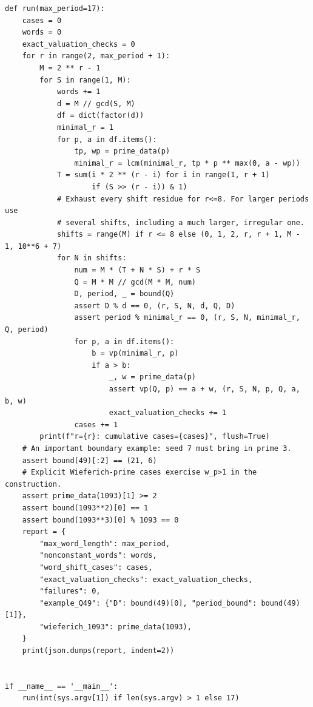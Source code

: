 \documentclass[11pt]{article}
\theoremstyle{definition}
\theoremstyle{remark}
\begin{document}
\begin{lstlisting}
def run(max_period=17):
    cases = 0
    words = 0
    exact_valuation_checks = 0
    for r in range(2, max_period + 1):
        M = 2 ** r - 1
        for S in range(1, M):
            words += 1
            d = M // gcd(S, M)
            df = dict(factor(d))
            minimal_r = 1
            for p, a in df.items():
                tp, wp = prime_data(p)
                minimal_r = lcm(minimal_r, tp * p ** max(0, a - wp))
            T = sum(i * 2 ** (r - i) for i in range(1, r + 1)
                    if (S >> (r - i)) & 1)
            # Exhaust every shift residue for r<=8. For larger periods use
            # several shifts, including a much larger, irregular one.
            shifts = range(M) if r <= 8 else (0, 1, 2, r, r + 1, M - 1, 10**6 + 7)
            for N in shifts:
                num = M * (T + N * S) + r * S
                Q = M * M // gcd(M * M, num)
                D, period, _ = bound(Q)
                assert D % d == 0, (r, S, N, d, Q, D)
                assert period % minimal_r == 0, (r, S, N, minimal_r, Q, period)
                for p, a in df.items():
                    b = vp(minimal_r, p)
                    if a > b:
                        _, w = prime_data(p)
                        assert vp(Q, p) == a + w, (r, S, N, p, Q, a, b, w)
                        exact_valuation_checks += 1
                cases += 1
        print(f"r={r}: cumulative cases={cases}", flush=True)
    # An important boundary example: seed 7 must bring in prime 3.
    assert bound(49)[:2] == (21, 6)
    # Explicit Wieferich-prime cases exercise w_p>1 in the construction.
    assert prime_data(1093)[1] >= 2
    assert bound(1093**2)[0] == 1
    assert bound(1093**3)[0] % 1093 == 0
    report = {
        "max_word_length": max_period,
        "nonconstant_words": words,
        "word_shift_cases": cases,
        "exact_valuation_checks": exact_valuation_checks,
        "failures": 0,
        "example_Q49": {"D": bound(49)[0], "period_bound": bound(49)[1]},
        "wieferich_1093": prime_data(1093),
    }
    print(json.dumps(report, indent=2))


if __name__ == '__main__':
    run(int(sys.argv[1]) if len(sys.argv) > 1 else 17)

\end{lstlisting}
\end{document}
